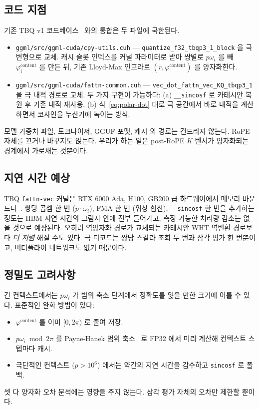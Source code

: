 \documentclass[10pt,twocolumn]{article}
\begin{document}
\subsection{코드 지점}

기존 TBQ v1 코드베이스~\cite{turboquant_impl2026} 와의 통합은 두 파일에 국한된다.

\begin{itemize}[leftmargin=*,topsep=2pt,itemsep=1pt]
\item \texttt{ggml/src/ggml-cuda/cpy-utils.cuh} --- \texttt{quantize\_f32\_tbqp3\_1\_block} 을 극 변형으로 교체. 캐시 슬롯 인덱스를 커널 파라미터로 받아 쌍별로 $p\omega_i$ 를 빼 $\varphi^{\text{content}}_i$ 를 만든 뒤, 기존 Lloyd-Max 인프라로 $(r,\varphi^{\text{content}})$ 를 양자화한다.
\item \texttt{ggml/src/ggml-cuda/fattn-common.cuh} --- \texttt{vec\_dot\_fattn\_vec\_KQ\_tbqp3\_1} 을 극 내적 경로로 교체. 두 가지 구현이 가능하다: (a) \texttt{\_\_sincosf} 로 카테시안 복원 후 기존 내적 재사용, (b) 식~\eqref{eq:polar-dot} 대로 극 공간에서 바로 내적을 계산하면서 코사인을 누산기에 녹이는 방식.
\end{itemize}

모델 가중치 파일, 토크나이저, GGUF 포맷, 캐시 외 경로는 건드리지 않는다. RoPE 자체를 끄거나 바꾸지도 않는다. 우리가 하는 일은 post-RoPE $K$ 텐서가 양자화되는 경계에서 가로채는 것뿐이다.

\subsection{지연 시간 예상}

TBQ \texttt{fattn-vec} 커널은 RTX 6000 Ada, H100, GB200 급 하드웨어에서 메모리 바운드다~\cite{turboquant_impl2026}. 쌍당 곱셈 한 번 ($p\cdot\omega_i$), FMA 한 번 (위상 합산), \texttt{\_\_sincosf} 한 번을 추가하는 정도는 HBM 지연 시간의 그림자 안에 전부 들어가고, 측정 가능한 처리량 감소는 없을 것으로 예상된다. 오히려 역양자화 경로가 교체되는 카테시안 WHT 역변환 경로보다 \emph{더 저렴} 해질 수도 있다. 극 디코드는 쌍당 스칼라 조회 두 번과 삼각 평가 한 번뿐이고, 버터플라이 네트워크도 없기 때문이다.

\subsection{정밀도 고려사항}

긴 컨텍스트에서는 $p\omega_i$ 가 범위 축소 단계에서 정확도를 잃을 만한 크기에 이를 수 있다. 표준적인 완화 방법이 있다:
\begin{itemize}[leftmargin=*,topsep=1pt,itemsep=0pt]
\item $\varphi^{\text{content}}$ 를 이미 $[0,2\pi)$ 로 줄여 저장.
\item $p\omega_i\bmod 2\pi$ 를 Payne-Hanek 범위 축소~\cite{payne1983} 로 FP32 에서 미리 계산해 컨텍스트 스텝마다 캐시.
\item 극단적인 컨텍스트 ($p>10^6$) 에서는 약간의 지연 시간을 감수하고 \texttt{sincosf} 로 폴백.
\end{itemize}
셋 다 양자화 오차 분석에는 영향을 주지 않는다. 삼각 평가 자체의 오차만 제한할 뿐이다.
\end{document}
